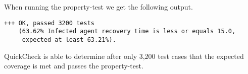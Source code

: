 When running the property-test we get the following output.

\begin{footnotesize}
\begin{verbatim}
+++ OK, passed 3200 tests 
    (63.62% Infected agent recovery time is less or equals 15.0, 
     expected at least 63.21%).
\end{verbatim}
\end{footnotesize}

QuickCheck is able to determine after only 3,200 test cases that the expected coverage is met and passes the property-test.